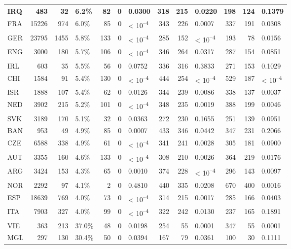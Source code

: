 \begin{tabular}{l|r|r|l|r|r|l|r|r|l|r|r|l}
\hline
IRQ & 483 & 32 & 6.2\% & 82 & 0 & 0.0300 & 318 & 215 & 0.0220 & 198 & 124 & 0.1379\\
\hline
FRA & 15226 & 974 & 6.0\% & 85 & 0 & < 10\textsuperscript{--4} & 343 & 226 & 0.0007 & 337 & 191 & 0.0308\\
\hline
GER & 23795 & 1455 & 5.8\% & 133 & 0 & < 10\textsuperscript{--4} & 285 & 152 & < 10\textsuperscript{--4} & 193 & 78 & 0.0156\\
\hline
ENG & 3000 & 180 & 5.7\% & 106 & 0 & < 10\textsuperscript{--4} & 346 & 264 & 0.0317 & 287 & 154 & 0.0851\\
\hline
IRL & 603 & 35 & 5.5\% & 56 & 0 & 0.0752 & 336 & 316 & 0.3833 & 271 & 153 & 0.1029\\
\hline
CHI & 1584 & 91 & 5.4\% & 130 & 0 & < 10\textsuperscript{--4} & 444 & 254 & < 10\textsuperscript{--4} & 529 & 187 & < 10\textsuperscript{--4}\\
\hline
ISR & 1888 & 107 & 5.4\% & 62 & 0 & 0.0126 & 344 & 239 & 0.0086 & 338 & 137 & 0.0037\\
\hline
NED & 3902 & 215 & 5.2\% & 101 & 0 & < 10\textsuperscript{--4} & 348 & 235 & 0.0019 & 388 & 199 & 0.0046\\
\hline
SVK & 3189 & 170 & 5.1\% & 32 & 0 & 0.0363 & 272 & 230 & 0.1655 & 251 & 139 & 0.0951\\
\hline
BAN & 953 & 49 & 4.9\% & 85 & 0 & 0.0007 & 433 & 346 & 0.0442 & 347 & 231 & 0.2066\\
\hline
CZE & 6588 & 338 & 4.9\% & 61 & 0 & < 10\textsuperscript{--4} & 341 & 241 & 0.0028 & 305 & 181 & 0.0900\\
\hline
AUT & 3355 & 160 & 4.6\% & 133 & 0 & < 10\textsuperscript{--4} & 308 & 210 & 0.0026 & 364 & 219 & 0.0176\\
\hline
ARG & 3424 & 153 & 4.3\% & 65 & 0 & 0.0010 & 374 & 228 & < 10\textsuperscript{--4} & 296 & 143 & 0.0097\\
\hline
NOR & 2292 & 97 & 4.1\% & 2 & 0 & 0.4810 & 440 & 335 & 0.0208 & 670 & 400 & 0.0016\\
\hline
ESP & 18639 & 769 & 4.0\% & 73 & 0 & < 10\textsuperscript{--4} & 314 & 215 & 0.0017 & 285 & 166 & 0.0403\\
\hline
ITA & 7903 & 327 & 4.0\% & 99 & 0 & < 10\textsuperscript{--4} & 322 & 242 & 0.0130 & 237 & 165 & 0.1891\\
\hline
VIE & 363 & 213 & 37.0\% & 48 & 0 & 0.0198 & 254 & 55 & 0.0001 & 347 & 55 & 0.0001\\
\hline
MGL & 297 & 130 & 30.4\% & 50 & 0 & 0.0394 & 167 & 79 & 0.0361 & 100 & 30 & 0.1111\\

\end{tabular}
